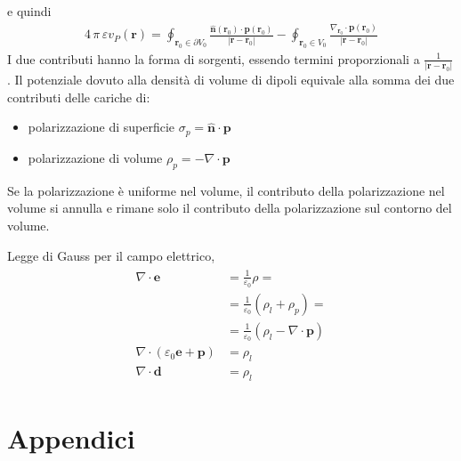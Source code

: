\documentclass[letterpaper,10pt,english]{jupyterBook}
\begin{document}
\sphinxAtStartPar
e quindi
\begin{equation*}
\begin{split}4 \, \pi \, \varepsilon v_P(\mathbf{r}) = \oint_{\mathbf{r}_0 \in \partial V_0} \frac{\hat{\mathbf{n}}(\mathbf{r}_0) \cdot \mathbf{p}(\mathbf{r}_0)}{|\mathbf{r}-\mathbf{r}_0|} - \oint_{\mathbf{r}_0 \in V_0} \frac{\nabla_{\mathbf{r}_0} \cdot \mathbf{p}(\mathbf{r}_0)}{|\mathbf{r} - \mathbf{r}_0|}\end{split}
\end{equation*}
\sphinxAtStartPar
I due contributi hanno la forma di sorgenti, essendo termini proporzionali a \(\frac{1}{|\mathbf{r}-\mathbf{r}_0|}\).
Il potenziale dovuto alla densità di volume di dipoli equivale alla somma dei due contributi delle cariche di:
\begin{itemize}
\item {} 
\sphinxAtStartPar
polarizzazione di superficie \(\sigma_p =   \hat{\mathbf{n}} \cdot \mathbf{p}\)

\item {} 
\sphinxAtStartPar
polarizzazione di volume     \(\rho_p   = - \nabla \cdot \mathbf{p}\)

\end{itemize}

\sphinxAtStartPar
{} Se la polarizzazione è uniforme nel volume, il contributo della polarizzazione nel volume si annulla e rimane solo il contributo della polarizzazione sul contorno del volume.

\sphinxAtStartPar
{} Legge di Gauss per il campo elettrico,
\begin{equation*}
\begin{split}\begin{aligned}
  \nabla \cdot \mathbf{e} & = \frac{1}{\varepsilon_0} \rho = \\
                          & = \frac{1}{\varepsilon_0} \left( \rho_l + \rho_p \right) = \\
                          & = \frac{1}{\varepsilon_0} \left( \rho_l - \nabla \cdot \mathbf{p} \right) \\
  \nabla \cdot \left( \varepsilon_0 \mathbf{e} + \mathbf{p} \right) & = \rho_l \\
  \nabla \cdot  \mathbf{d} & = \rho_l
\end{aligned}\end{split}
\end{equation*}
\sphinxstepscope


\part{Appendici}
\end{document}
